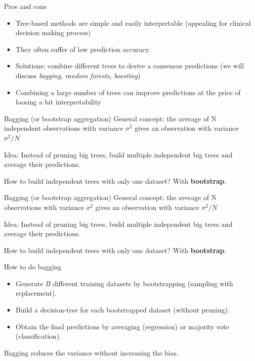 \documentclass[notes]{beamer}          %
\begin{document}
\begin{frame}{Pros and cons}
\begin{itemize}
 \item Tree-based methods are simple and easily interpretable (appealing for clinical decision making process)
 \item They often suffer of low prediction accuracy
 \item Solutions: combine different trees to derive a consensus predictions (we will discuss  \textit{bagging}, \textit{random forests}, \textit{boosting})
 \item Combining a large number of trees can improve predictions at the price of loosing a bit interpretability
\end{itemize}
\end{frame}


\begin{frame}{Bagging (or bootstrap aggregation)}
General concept: the average of N independent observations with variance $\sigma^2$ gives an observation with variance $\sigma^2/N$

\vspace{1cm}

Idea: Instead of pruning big trees, build multiple independent big trees and average their predictions.

\vspace{1cm}

How to build independent trees with only one dataset? With \textbf{bootstrap}.
\end{frame}

\begin{frame}{Bagging (or bootstrap aggregation)}
General concept: the average of N observations with variance $\sigma^2$ gives an observation with variance $\sigma^2/N$

\vspace{1cm}

Idea: Instead of pruning big trees, build multiple independent big trees and average their predictions.

\vspace{1cm}

How to build independent trees with only one dataset? With \textbf{bootstrap}.
\end{frame}

\begin{frame}{How to do bagging}

\begin{itemize}
\item Generate $B$ different training datasets by bootstrapping (sampling with replacement).
\item Build a decision-tree for each bootstrapped dataset (without pruning).
\item Obtain the final predictions by averaging (regression) or majority vote (classification).
\end{itemize}

Bagging reduces the variance without increasing the bias.
\end{frame}
\end{document}
